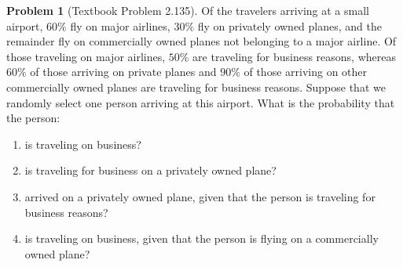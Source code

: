\documentclass[11pt, letterpaper]{article}
\theoremstyle{definition}
\newtheorem{problem}{Problem}
\begin{document}
\begin{problem}[Textbook Problem 2.135]
Of the travelers arriving at a small airport, $60\%$ fly on major airlines, $30\%$ fly on privately owned planes, and the remainder fly on commercially owned planes not belonging to a major airline. Of those traveling on major airlines, $50\%$ are traveling for business reasons, whereas $60\%$ of those arriving on private planes and $90\%$ of those arriving on other commercially owned planes are traveling for business reasons. Suppose that we randomly select one person arriving at this airport. What is the probability that the person:
\begin{enumerate}
    \item[\textbf{a}] is traveling on business?
    \item[\textbf{b}] is traveling for business on a privately owned plane?
    \item[\textbf{c}] arrived on a privately owned plane, given that the person is traveling for business reasons?
    \item[\textbf{d}] is traveling on business, given that the person is flying on a commercially owned plane?
\end{enumerate}
\end{problem}
\end{document}
